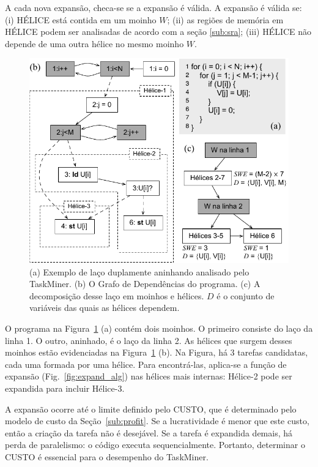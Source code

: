 \documentclass[sigplan,10pt,review]{acmart}
\newcommand\Taskminer{\mbox{\textsf{TaskMiner}}}
\begin{document}
A cada nova expansão, checa-se se a expansão é válida. A expansão é válida se:
(i) \textsf{HÉLICE} está contida em um moinho $W$;
(ii) as regiões de memória em \textsf{HÉLICE} podem ser analisadas de acordo com
a seção \ref{sub:sra};
(iii) \textsf{HÉLICE} não depende de uma outra hélice no mesmo moinho $W$.

\begin{figure}[h]
\begin{center}
\includegraphics[width=1\columnwidth]{images/ex_expansion}
\caption{(a) Exemplo de laço duplamente aninhando analisado pelo {\Taskminer}.
(b) O Grafo de Dependências do programa.
(c) A decomposição desse laço em moinhos e hélices. $D$ é o conjunto de variáveis
das quais as hélices dependem.}
\label{fig:ex_expansion}
\end{center}
\end{figure}

O programa na Figura~\ref{fig:ex_expansion} (a) contém dois moinhos.
O primeiro consiste do laço da linha 1. O outro, aninhado, é o laço da linha 2.
As hélices que surgem desses moinhos estão evidenciadas na Figura~\ref{fig:ex_expansion} (b).
Na Figura, há 3 tarefas candidatas, cada uma formada por uma hélice.
Para encontrá-las, aplica-se a função de expansão (Fig.~\ref{fig:expand_alg})
nas hélices mais internas: \textsf{Hélice-2} pode ser expandida para incluir \textsf{Hélice-3}.

A expansão ocorre até o limite definido pelo \textsf{CUSTO}, que é determinado pelo modelo de custo
da Seção~\ref{sub:profit}. Se a lucratividade é menor que este custo, então
a criação da tarefa não é desejável. Se a tarefa é expandida demais, 
há perda de paralelismo: o código executa sequencialmente. Portanto, determinar o \textsf{CUSTO}
é essencial para o desempenho do {\Taskminer}.
\end{document}
